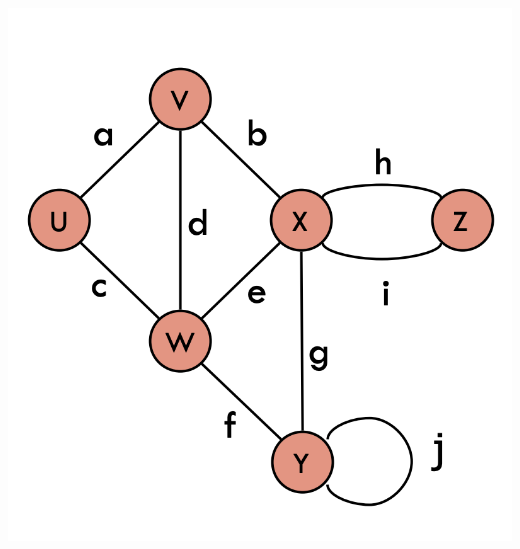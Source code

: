 \documentclass[12pt]{article}
\newcommand{\1}{\space \quad}
\newcommand{\2}{\quad \quad \quad}
\newcommand{\3}{\quad \quad \quad \quad \space}
\newcommand{\4}{\quad \quad \quad \quad \quad \quad}
\newcommand{\5}{\quad \quad \quad \quad \quad \quad \quad \space}
\begin{document}
\begin{minipage}[r]{0.39\textwidth}
  \raggedleft
  \includegraphics[width=\textwidth]{image16.png}
\end{minipage}
\end{document}
